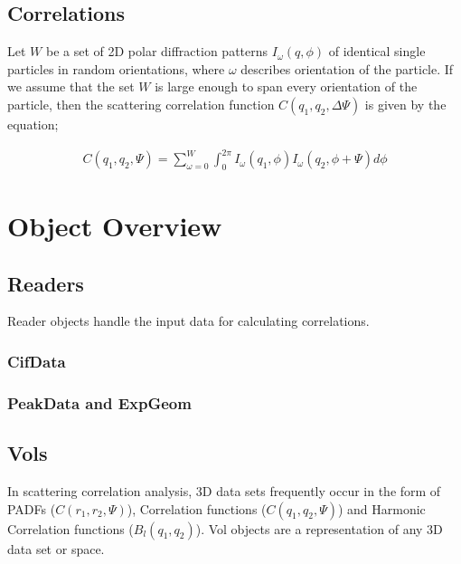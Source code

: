 \documentclass[a4, 12pt]{article}
\begin{document}


\subsection{Correlations}

Let $W$ be a set of 2D polar diffraction patterns $I_\omega(q, \phi)$ of identical single particles in random orientations, where $\omega$ describes orientation of the particle. If we assume that the set $W$ is large enough to span every orientation of the particle, then the scattering correlation function $C(q_1, q_2, \Delta \Psi)$ is given by the equation;

\begin{align*}
	C(q_1, q_2, \Psi) = \sum_{\omega=0}^W \int_0^{2\pi} I_\omega(q_1,\phi) I_\omega(q_2,\phi+\Psi) d\phi
\end{align*}






\section{Object Overview}


\subsection{Readers}

Reader objects handle the input data for calculating correlations.

\subsubsection{CifData}
\subsubsection{PeakData and ExpGeom}



\subsection{Vols}
In scattering correlation analysis, 3D data sets frequently occur in the form of PADFs ($C(r_1, r_2, \Psi)$), Correlation functions ($C(q_1, q_2, \Psi)$) and Harmonic Correlation functions ($B_l(q_1, q_2)$). Vol objects are a representation of any 3D data set or space.


 
\end{document}
